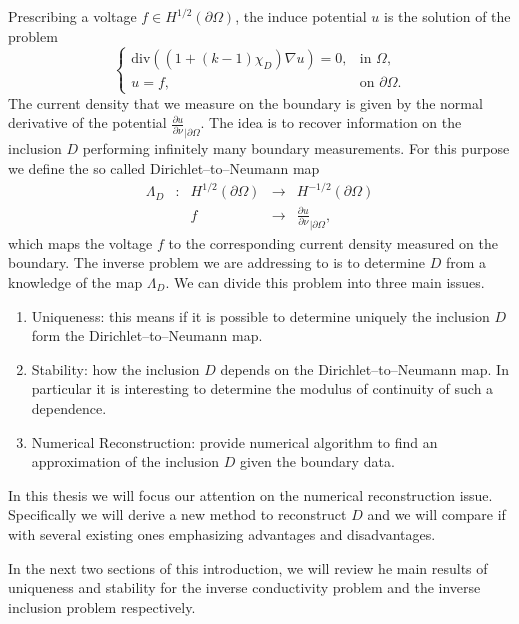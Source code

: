 \documentclass[10pt, a4paper, twoside, openright]{book}
\theoremstyle{definition}
\theoremstyle{plain}
\theoremstyle{plain}
\theoremstyle{plain}
\theoremstyle{plain}
\theoremstyle{plain}
\theoremstyle{plain}
\theoremstyle{plain}
\theoremstyle{plain}
\begin{document}
Prescribing a voltage $f\in H^{1/2}(\partial\Omega)$, the induce potential $u$ is the solution of the problem
$$\left\{\begin{array}{ll}
\mathrm{div}((1+(k-1)\chi_D)\nabla u)=0, & \textrm{in }\Omega,\\
u=f, & \textrm{on }\partial\Omega.
\end{array}\right.$$
The current density that we measure on the boundary is given by the normal derivative of the potential
$\frac{\partial u}{\partial\nu}_{|\partial\Omega}$. The idea is to recover information on the inclusion $D$ performing infinitely many
boundary measurements. For this purpose we define the so called Dirichlet--to--Neumann map
$$\begin{array}{ccccc}
\Lambda_D & : & H^{1/2}(\partial\Omega) & \longrightarrow & H^{-1/2}(\partial\Omega)\\
          &   &   f                     & \longrightarrow & \frac{\partial u}{\partial\nu}_{|\partial\Omega},
\end{array}$$
which maps the voltage $f$ to the corresponding current density measured on the boundary.
The inverse problem we are addressing to is to determine $D$ from a knowledge of the map $\Lambda_D$.
We can divide this problem into three main issues.
\begin{enumerate}
\item Uniqueness: this means if it is possible to determine uniquely the inclusion $D$ form the Dirichlet--to--Neumann map.
\item Stability: how the inclusion $D$ depends on the Dirichlet--to--Neumann map. In particular it is interesting
to determine the modulus of continuity of such a dependence.
\item Numerical Reconstruction: provide numerical algorithm to find an approximation of the inclusion $D$ given the boundary data.
\end{enumerate}
In this thesis we will focus our attention on the numerical reconstruction issue.
Specifically we will derive a new method to reconstruct $D$ and we will compare if with several existing ones
emphasizing advantages and disadvantages.

In the next two sections of this introduction, we will review he main results of uniqueness and stability
for the inverse conductivity problem and the inverse inclusion problem respectively.


\end{document}
